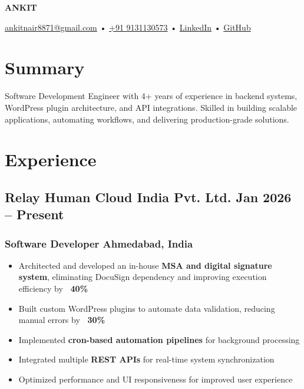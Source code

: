 \documentclass[11pt]{article}
\begin{document}
\begin{center}
    {\fontsize{32}{32}\selectfont \textbf{ANKIT}} \\ \bigskip
    
    \small
    {\color{icnclr}\faEnvelope} \href{mailto:ankitnair8871@gmail.com}{ankitnair8871@gmail.com} \hspace{8pt} • \hspace{8pt}
    {\color{icnclr}} \href{tel:+919131130573}{+91 9131130573} \hspace{8pt} • \hspace{8pt}
    {\color{icnclr}\faLinkedinIn} \href{https://www.linkedin.com/in/ankit-nair-a57414187}{LinkedIn} \hspace{8pt} • \hspace{8pt}
    {\color{icnclr}\faGithub} \href{https://github.com/ankit8871261605}{GitHub}
\end{center}

\section{Summary}
Software Development Engineer with 4+ years of experience in backend systems, WordPress plugin architecture, and API integrations. Skilled in building scalable applications, automating workflows, and delivering production-grade solutions.

\section{Experience}

\subsection{Relay Human Cloud India Pvt. Ltd. \hfill Jan 2026 -- Present}
\subsubsection{Software Developer \hfill Ahmedabad, India}
\begin{itemize}
\item Architected and developed an in-house \textbf{MSA and digital signature system}, eliminating DocuSign dependency and improving execution efficiency by \textbf{~40\%}
\item Built custom WordPress plugins to automate data validation, reducing manual errors by \textbf{~30\%}
\item Implemented \textbf{cron-based automation pipelines} for background processing
\item Integrated multiple \textbf{REST APIs} for real-time system synchronization
\item Optimized performance and UI responsiveness for improved user experience
\end{itemize}
\end{document}
